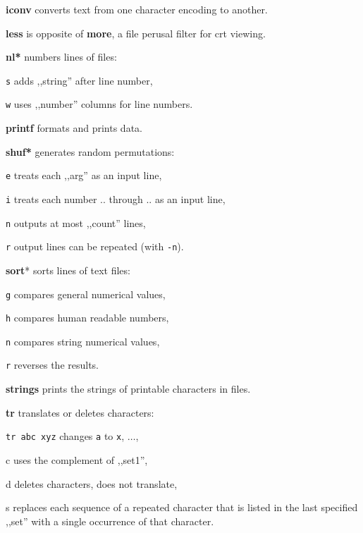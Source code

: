 \textbf{iconv} converts text from one character encoding to another.

\textbf{less} is opposite of \textbf{more}, a file perusal filter for crt viewing.

\textbf{nl*} numbers lines of files:
\begin{enumx}
	\item [\texttt{s}] adds ,,string'' after line number,
	\item [\texttt{w}] uses ,,number'' columns for line numbers.
\end{enumx}


\textbf{printf} formats and prints data.

\textbf{shuf*} generates random permutations:
\begin{enumx}
	\item [\texttt{e}] treats each ,,arg'' as an input line,
	\item [\texttt{i}] treats each number .. through .. as an input line, 
	\item [\texttt{n}] outputs at most ,,count'' lines,
	\item [\texttt{r}] output lines can be repeated (with \texttt{-n}).
\end{enumx}

\textbf{sort}* sorts lines of text files:
\begin{enumx}
	\item [\texttt{g}] compares general numerical values,
	\item [\texttt{h}] compares human readable numbers,
	\item [\texttt{n}] compares string numerical values,
	\item [\texttt{r}] reverses the results.
\end{enumx}

\textbf{strings} prints the strings of printable characters in files.

\textbf{tr} translates or deletes characters:
\begin{enumx}
	\item \texttt{tr abc xyz} changes \texttt{a} to \texttt{x}, $\ldots$,
	\item [c] uses the complement of ,,set1'',
	\item [d] deletes characters, does not translate,
	\item [s] replaces each sequence of a repeated character that is listed 
	in the last specified ,,set'' with a single occurrence of that character.
\end{enumx}

